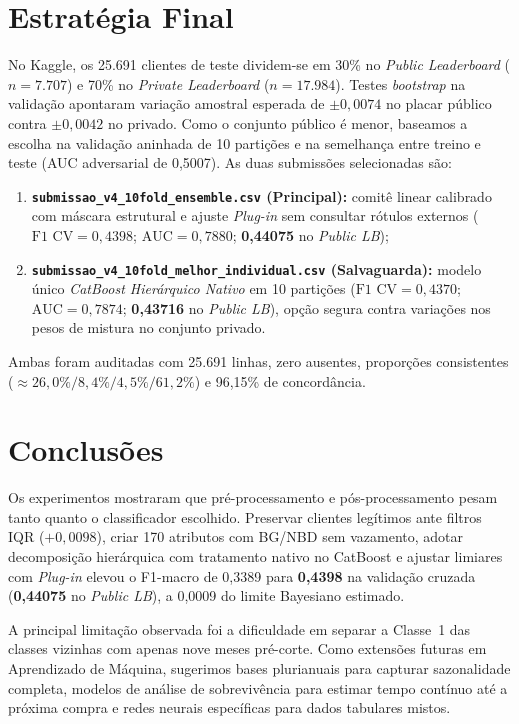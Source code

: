 \documentclass[10pt, conference, compsocconf]{IEEEtran}
\begin{document}
\section{Estratégia Final}
No Kaggle, os 25.691 clientes de teste dividem-se em 30\% no \textit{Public Leaderboard} ($n=7.707$) e 70\% no \textit{Private Leaderboard} ($n=17.984$). Testes \textit{bootstrap} na validação apontaram variação amostral esperada de $\pm 0{,}0074$ no placar público contra $\pm 0{,}0042$ no privado. Como o conjunto público é menor, baseamos a escolha na validação aninhada de 10 partições e na semelhança entre treino e teste (AUC adversarial de 0,5007). As duas submissões selecionadas são:
\begin{enumerate}
\item \textbf{\texttt{submissao\_v4\_10fold\_ensemble.csv} (Principal):} comitê linear calibrado com máscara estrutural e ajuste \textit{Plug-in} sem consultar rótulos externos ($\text{F1 CV}=0{,}4398$; $\text{AUC}=0{,}7880$; \textbf{0,44075} no \textit{Public LB});
\item \textbf{\texttt{submissao\_v4\_10fold\_melhor\_individual.csv} (Salvaguarda):} modelo único \textit{CatBoost Hierárquico Nativo} em 10 partições ($\text{F1 CV}=0{,}4370$; $\text{AUC}=0{,}7874$; \textbf{0,43716} no \textit{Public LB}), opção segura contra variações nos pesos de mistura no conjunto privado.
\end{enumerate}
Ambas foram auditadas com 25.691 linhas, zero ausentes, proporções consistentes ($\approx 26{,}0\% / 8{,}4\% / 4{,}5\% / 61{,}2\%$) e 96,15\% de concordância.

\section{Conclusões}
Os experimentos mostraram que pré-processamento e pós-processamento pesam tanto quanto o classificador escolhido. Preservar clientes legítimos ante filtros IQR ($+0{,}0098$), criar 170 atributos com BG/NBD sem vazamento, adotar decomposição hierárquica com tratamento nativo no CatBoost e ajustar limiares com \textit{Plug-in} elevou o F1-macro de 0,3389 para \textbf{0,4398} na validação cruzada (\textbf{0,44075} no \textit{Public LB}), a 0,0009 do limite Bayesiano estimado.

A principal limitação observada foi a dificuldade em separar a Classe~1 das classes vizinhas com apenas nove meses pré-corte. Como extensões futuras em Aprendizado de Máquina, sugerimos bases plurianuais para capturar sazonalidade completa, modelos de análise de sobrevivência para estimar tempo contínuo até a próxima compra e redes neurais específicas para dados tabulares mistos.

\FloatBarrier



\end{document}
